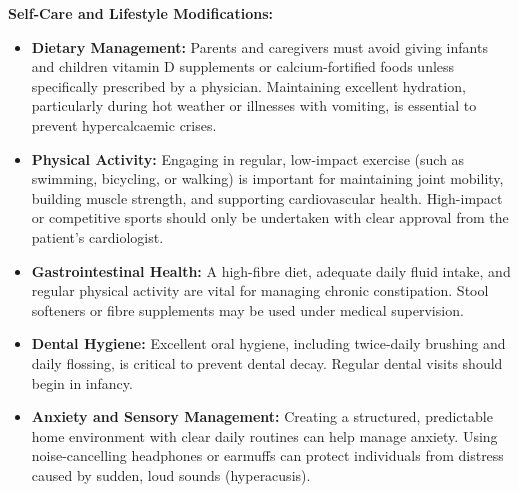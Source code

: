 \textbf{Self-Care and Lifestyle Modifications:}
\begin{itemize}
    \item \textbf{Dietary Management:} Parents and caregivers must avoid giving infants and children vitamin D supplements or calcium-fortified foods unless specifically prescribed by a physician. Maintaining excellent hydration, particularly during hot weather or illnesses with vomiting, is essential to prevent hypercalcaemic crises.
    \item \textbf{Physical Activity:} Engaging in regular, low-impact exercise (such as swimming, bicycling, or walking) is important for maintaining joint mobility, building muscle strength, and supporting cardiovascular health. High-impact or competitive sports should only be undertaken with clear approval from the patient's cardiologist.
    \item \textbf{Gastrointestinal Health:} A high-fibre diet, adequate daily fluid intake, and regular physical activity are vital for managing chronic constipation. Stool softeners or fibre supplements may be used under medical supervision.
    \item \textbf{Dental Hygiene:} Excellent oral hygiene, including twice-daily brushing and daily flossing, is critical to prevent dental decay. Regular dental visits should begin in infancy.
    \item \textbf{Anxiety and Sensory Management:} Creating a structured, predictable home environment with clear daily routines can help manage anxiety. Using noise-cancelling headphones or earmuffs can protect individuals from distress caused by sudden, loud sounds (hyperacusis).
\end{itemize}


